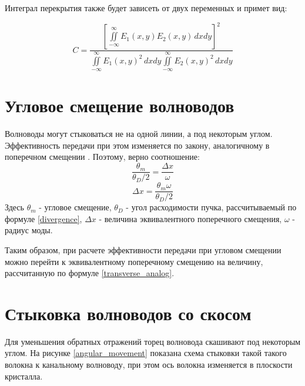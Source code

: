 Интеграл перекрытия также будет зависеть от двух переменных и примет вид:

\begin{equation}
	\label{coupling_2d}
	C = \frac{\left[\iint\limits_{-\infty}^{\infty}E_{1}(x,y)E_{2}(x,y) \,dxdy\right]^2}
	{\iint\limits_{-\infty}^{\infty}E_{1}(x,y)^2 \,dxdy
	 \iint\limits_{-\infty}^{\infty}E_{2}(x,y)^2 \,dxdy}
\end{equation}

\section{Угловое смещение волноводов}
Волноводы могут стыковаться не на одной линии, а под некоторым углом. Эффективность передачи при этом изменяется по закону, аналогичному в поперечном смещении \cite{lefevre}. Поэтому, верно соотношение:
\begin{equation}
	\frac{\theta_m}{\theta_D/2}	= \frac{\Delta x}{\omega}
\end{equation}
\begin{equation}
	\Delta x = \frac{\theta_m \omega}{\theta_D/2}
	\label{transverse_analog}
\end{equation}
Здесь $\theta_m$ - угловое смещение, $\theta_D$ - угол расходимости пучка, рассчитываемый по формуле \ref{divergence}, $\Delta x$ - величина эквивалентного поперечного смещения, $\omega$ - радиус моды. 

Таким образом, при расчете эффективности передачи при  угловом смещении можно перейти к эквивалентному поперечному смещению на величину, рассчитанную по формуле \ref{transverse_analog}.

\section{Стыковка волноводов со скосом}
Для уменьшения обратных отражений торец волновода скашивают под некоторым углом. На рисунке \ref{angular_movement} показана схема стыковки такой такого волокна к канальному волноводу, при этом ось волокна изменяется в плоскости кристалла. 

